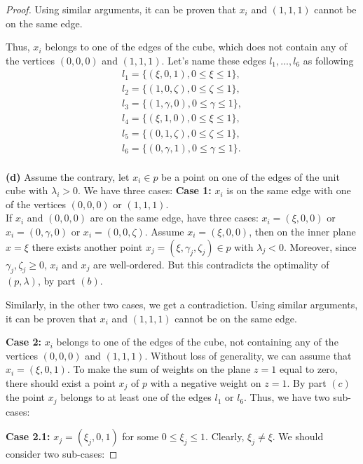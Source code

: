 \documentclass[12p]{article}
\numberwithin{equation}{section}
\begin{document}
\begin{proof}
Using similar arguments, it can be proven that \(x_i\) and \((1,1,1)\) cannot be on the same edge.

Thus, \(x_i\) belongs to one of the edges of the cube, which does not contain any of the vertices \((0,0,0)\) and \((1,1,1)\).
Let's name these edges \(l_1,...,l_6\) as following 
\begin{align*}    
    l_1=\{(\xi,0,1), 0 \le \xi \le 1\}, \\
    l_2=\{(1,0,\zeta), 0 \le \zeta \le 1\},\\
    l_3=\{(1,\gamma,0), 0 \le \gamma \le 1\}, \\
    l_4=\{(\xi,1,0), 0 \le \xi \le 1\},\\
    l_5=\{(0,1,\zeta), 0 \le \zeta \le 1\}, \\
    l_6=\{(0,\gamma,1), 0 \le \gamma \le 1\}.\\
\end{align*}

\textbf{(d)}
    Assume the contrary, let \(x_i \in p\) be a point on one of the edges of the unit cube with \(\lambda_i>0\). We have three cases:
    \textbf{Case 1:} \(x_i\) is on the same edge with one of the vertices \((0,0,0)\) or \((1,1,1)\).\\
    If \(x_i\) and \((0,0,0)\) are on the same edge, have three cases: \(x_i=(\xi,0,0)\) or \(x_i=(0,\gamma,0)\) or \(x_i=(0,0,\zeta)\). Assume \(x_i=(\xi,0,0)\), then on the inner plane \(x=\xi\) there exists another point \(x_j=(\xi,\gamma_j,\zeta_j) \in p\) with \(\lambda_j<0\). Moreover, since \(\gamma_j,\zeta_j \ge 0\), \(x_i\) and \(x_j\) are well-ordered. But this contradicts the optimality of \((p,\lambda)\), by part \((b)\). 
    
    Similarly, in the other two cases, we get a contradiction.
    Using similar arguments, it can be proven that \(x_i\) and \((1,1,1)\) cannot be on the same edge.
    
    \textbf{Case 2:} \(x_i\) belongs to one of the edges of the cube, not containing any of the vertices \((0,0,0)\) and \((1,1,1)\). Without loss of generality, we can assume that \(x_i=(\xi,0,1)\). To make the sum of weights on the plane \(z=1\) equal to zero, there should exist a point \(x_j\) of \(p\) with a negative weight on \(z=1\). By part \((c)\) the point \(x_j\) belongs to at least one of the edges \(l_1\) or \(l_6\). Thus, we have two sub-cases:
    
    \textbf{Case 2.1:} \(x_j=(\xi_j,0,1)\) for some \(0 \le \xi_j \le 1\).  Clearly, \(\xi_j \ne \xi\). We should consider two sub-cases:
    

\end{proof}
\end{document}
